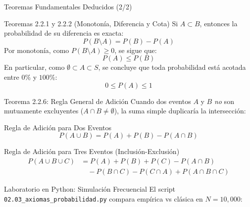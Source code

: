 \documentclass[10pt,aspectratio=169]{beamer}
\begin{document}
\begin{frame}{Teoremas Fundamentales Deducidos (2/2)}
  \begin{block}{Teoremas 2.2.1 y 2.2.2 (Monotonía, Diferencia y Cota)}
    Si $A \subset B$, entonces la probabilidad de su diferencia es exacta:
    $$P(B \setminus A) = P(B) - P(A)$$
    Por monotonía, como $P(B \setminus A) \geq 0$, se sigue que:
    $$P(A) \leq P(B)$$
    En particular, como $\emptyset \subset A \subset S$, se concluye que toda probabilidad está acotada entre $0\%$ y $100\%$:
    $$0 \leq P(A) \leq 1$$
  \end{block}
\end{frame}

\begin{frame}{Teorema 2.2.6: Regla General de Adición}
  \small Cuando dos eventos $A$ y $B$ \emph{no} son mutuamente excluyentes ($A \cap B \neq \emptyset$), la suma simple duplicaría la intersección: \pause

  \vspace{0.2em}
  \begin{block}{Regla de Adición para Dos Eventos}
    $$P(A \cup B) = P(A) + P(B) - P(A \cap B)$$
  \end{block}

  \vspace{0.2em}
  \pause
  \begin{block}{Regla de Adición para Tres Eventos (Inclusión-Exclusión)}
    \begin{align*}
      P(A \cup B \cup C) &= P(A) + P(B) + P(C) - P(A \cap B) \\
                         &\quad - P(B \cap C) - P(C \cap A) + P(A \cap B \cap C)
    \end{align*}
  \end{block}
\end{frame}

\begin{frame}[fragile]{Laboratorio en Python: Simulación Frecuencial}
  El script \texttt{02.03\_axiomas\_probabilidad.py} compara empírica vs clásica en $N = 10,000$:
  \vspace{0.2em}
  {
  }
\end{frame}
\end{document}
